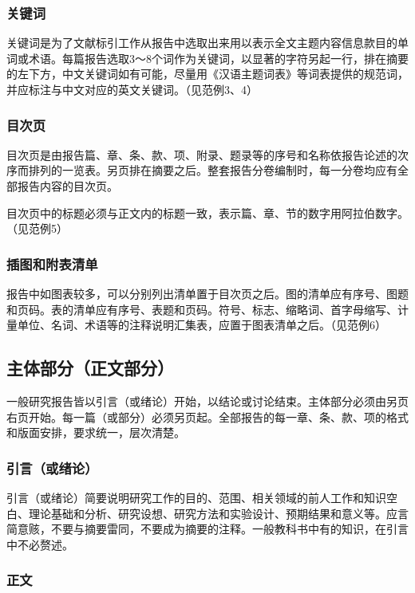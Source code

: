 \subsubsection{关键词}

关键词是为了文献标引工作从报告中选取出来用以表示全文主题内容信息款目的单词或术语。每篇报告选取3～8个词作为关键词，以显著的字符另起一行，排在摘要的左下方，中文关键词如有可能，尽量用《汉语主题词表》等词表提供的规范词，并应标注与中文对应的英文关键词。（见范例3、4）

\subsubsection{目次页}

目次页是由报告篇、章、条、款、项、附录、题录等的序号和名称依报告论述的次序而排列的一览表。另页排在摘要之后。整套报告分卷编制时，每一分卷均应有全部报告内容的目次页。

目次页中的标题必须与正文内的标题一致，表示篇、章、节的数字用阿拉伯数字。（见范例5）

\subsubsection{插图和附表清单}

报告中如图表较多，可以分别列出清单置于目次页之后。图的清单应有序号、图题和页码。表的清单应有序号、表题和页码。符号、标志、缩略词、首字母缩写、计量单位、名词、术语等的注释说明汇集表，应置于图表清单之后。（见范例6）

\subsection{主体部分（正文部分）}

一般研究报告皆以引言（或绪论）开始，以结论或讨论结束。主体部分必须由另页右页开始。每一篇（或部分）必须另页起。全部报告的每一章、条、款、项的格式和版面安排，要求统一，层次清楚。

\subsubsection{引言（或绪论）}

引言（或绪论）简要说明研究工作的目的、范围、相关领域的前人工作和知识空白、理论基础和分析、研究设想、研究方法和实验设计、预期结果和意义等。应言简意赅，不要与摘要雷同，不要成为摘要的注释。一般教科书中有的知识，在引言中不必赘述。

\subsubsection{正文}

